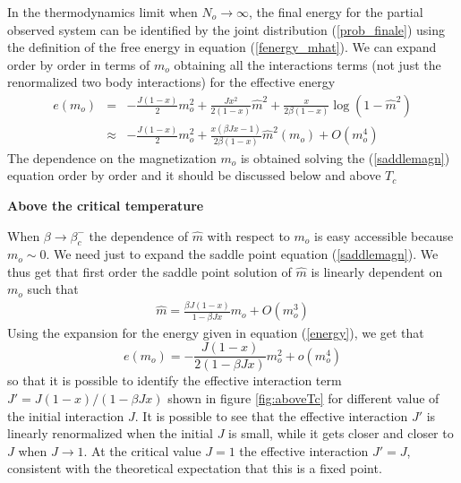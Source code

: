 \documentclass[aps,pre,noshowpacs]{revtex4}
\begin{document}
In the thermodynamics limit when $N_o\to \infty$, the final energy for the partial observed system can be identified by the joint distribution (\ref{prob_finale}) using the definition
of the free energy in equation (\ref{fenergy_mhat}).
We can expand order by order in terms of $m_o$ obtaining all the interactions terms (not just the renormalized two body interactions) for the effective energy 
\begin{eqnarray}\label{energy}
e(m_o) &=& -\frac{J (1-x) }{2} m_o^2 + \frac{J x^2}{2(1-x)} \hat{m}^2 +  \frac{x}{2\beta (1-x) } \log(1-\hat{m}^2)\nonumber\\
&\approx& -\frac{J (1-x) }{2} m_o^2 +\frac{x(\beta J x -1)}{2\beta (1-x)} \hat{m}^2(m_o) +  O(m_o^4)
 \end{eqnarray}
The dependence on the magnetization $m_o$ is obtained solving the (\ref{saddlemagn}) equation order by order and it should be discussed below and above $T_c$

\textbf{Above the critical temperature}

When $\beta \to\beta_c^-$ the dependence of $\hat{m}$ with respect to $m_o$ is easy accessible because $m_o\sim 0$.
We need just to expand the saddle point equation (\ref{saddlemagn}). We thus get that first order the saddle point solution of $\hat{m}$ is linearly dependent on $m_o$ such that
\begin{eqnarray}
\hat{m}= \frac{\beta J (1-x)}{ 1-\beta J x} m_o  + O(m_o^3)
\end{eqnarray}
Using the expansion for the energy given in equation (\ref{energy}), we get that 
\begin{equation}\label{energy2}
e(m_o) = -\frac{J (1-x) }{2 (1-\beta J x)} m_o^2  + o(m_o^4)
 \end{equation}
 so that it is possible to identify the effective interaction term $J'=J(1-x)/(1-\beta Jx)$ shown in figure \ref{fig:aboveTc} for different value of the initial interaction $J$. It is possible to see that the effective interaction $J'$ is linearly renormalized when the initial $J$ is small, while it gets closer and closer to $J$ when $J\to 1$. At the critical value $J=1$ the effective interaction $J'=J$, consistent with the theoretical expectation that this is a fixed point.
\end{document}
